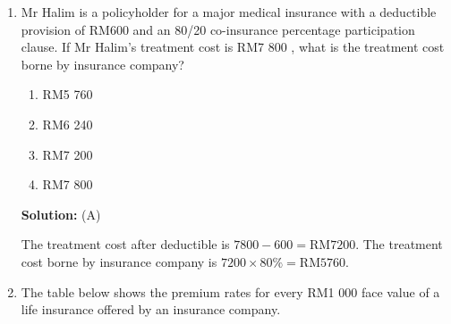 \documentclass{report}
\newcommand{\sol}{

    \vspace{0.5em}\textbf{Solution:}\vspace{0.5em}}
\begin{document}
\begin{enumerate}
    \item Mr Halim is a policyholder for a major medical insurance with a deductible
          provision of RM600 and an 80/20 co-insurance percentage participation clause.
          If Mr Halim's treatment cost is RM7 800 , what is the treatment cost borne by
          insurance company?
          \begin{enumerate}
              \item RM5 760
              \item RM6 240
              \item RM7 200
              \item RM7 800
          \end{enumerate}
          \sol{} (A)

          The treatment cost after deductible is $7 800 - 600 = \text{RM} 7 200$. The
          treatment cost borne by insurance company is $7 200 \times 80 \% = \text{RM} 5
              760$. \vspace{0.5cm}

    \item The table below shows the premium rates for every RM1 000 face value of a life
          insurance offered by an insurance company.


\end{enumerate}
\end{document}
